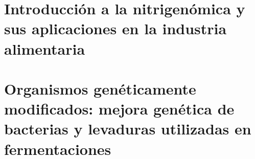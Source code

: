 \documentclass{AsignaturaResumen}
\begin{document}
    \chapter{Introducción a la nitrigenómica y sus aplicaciones en la industria alimentaria}
    \chapter{Organismos genéticamente modificados: mejora genética de bacterias y levaduras utilizadas en fermentaciones}


    \appendix{}

    \backmatter

\end{document}
